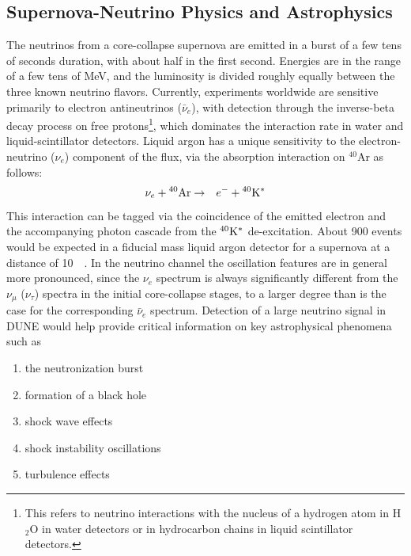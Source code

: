 \subsection{Supernova-Neutrino Physics and Astrophysics}

The neutrinos from a core-collapse supernova are emitted in a burst of
a few tens of seconds duration, with about half in the first
second. Energies are in the range of a few tens of MeV, and the
luminosity is divided roughly equally between the three known neutrino
flavors.  Currently, experiments worldwide are sensitive primarily to
electron antineutrinos ($\bar{\nu}_e$), with detection through the inverse-beta decay
process on free protons\footnote{This refers to neutrino interactions with the nucleus of a
hydrogen atom in H$_2$O in water detectors or in hydrocarbon chains in 
liquid scintillator detectors.},
 which dominates the interaction rate in water
and liquid-scintillator detectors.  Liquid argon has a unique sensitivity to
the electron-neutrino ($\nu_e$) component of the flux, via the absorption
interaction on $^{40}$Ar as follows:
\begin{eqnarray*}
\nu_e +{}^{40}{\rm Ar} & \rightarrow & e^-+{}^{40}{\rm K^*}
\end{eqnarray*} 
This interaction can be tagged via the coincidence of the emitted
electron and the accompanying photon cascade from the $^{40}{\rm K^*}$
de-excitation.  About 900 events would be expected in a 
fiducial mass liquid argon detector for a supernova at a distance of
\SI{10}{\kilo\parsec}.  In the neutrino channel the oscillation
features are in general more pronounced, since the $\nu_e$ spectrum is
always significantly different from the $\nu_\mu$ ($\nu_\tau$) spectra
in the initial core-collapse stages, to a larger degree than is the
case for the corresponding $\bar{\nu}_e$ spectrum.  Detection of a large
neutrino signal in DUNE would help provide critical information on key
astrophysical phenomena such as
\begin{enumerate}
\item the neutronization burst
\item formation of a black hole
\item shock wave effects
\item shock instability oscillations
\item turbulence effects
\end{enumerate}


